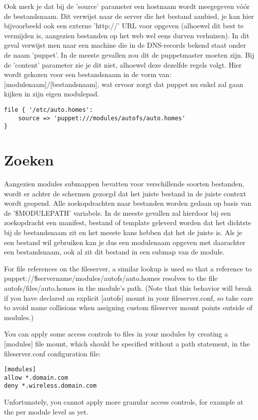 Ook merk je dat bij de 'source' parameter een hostnaam wordt meegegeven v\'o\'or de bestandsnaam. Dit verwijst naar de server die het bestand aanbied, je kan hier bijvoorbeeld ook een externe 'http://' URL voor opgeven (alhoewel dit best te vermijden is, aangezien bestanden op het web wel eens durven verhuizen). In dit geval verwijst men naar een machine die in de DNS-records bekend staat onder de naam 'puppet'. In de meeste gevallen zou dit de puppetmaster moeten zijn. Bij de 'content' parameter zie je dit niet, alhoewel deze dezelfde regels volgt. Hier wordt gekozen voor een bestandsnaam in de vorm van: [modulenaam]/[bestandsnaam], wat ervoor zorgt dat puppet nu enkel zal gaan kijken in zijn eigen modulepad.
%
\begin{code}
\begin{lstlisting}
file { '/etc/auto.homes':
    source => 'puppet:///modules/autofs/auto.homes'
}
\end{lstlisting}
\end{code}
%
\section{Zoeken}
Aangezien modules submappen bevatten voor verschillende soorten bestanden, wordt er achter de schermen gezorgd dat het juiste bestand in de juiste context wordt geopend. Alle zoekopdrachten naar bestanden worden gedaan op basis van de '\$MODULEPATH' variabele. In de meeste gevallen zal hierdoor bij een zoekopdracht een manifest, bestand of template geleverd worden dat het dichtste bij de bestandsnaam zit en het meeste kans hebben dat het de juiste is. Als je een bestand wil gebruiken kan je dus een modulenaam opgeven met daarachter een bestandsnaam, ook al zit dit bestand in een submap van de module.

For file references on the fileserver, a similar lookup is used so that a reference to puppet://\$servername/modules/autofs/auto.homes resolves to the file autofs/files/auto.homes in the module's path. (Note that this behavior will break if you have declared an explicit [autofs] mount in your fileserver.conf, so take care to avoid name collisions when assigning custom fileserver mount points outside of modules.)

You can apply some access controls to files in your modules by creating a [modules] file mount, which should be specified without a path statement, in the fileserver.conf configuration file:
%
\begin{code}
\begin{lstlisting}
[modules]
allow *.domain.com
deny *.wireless.domain.com
\end{lstlisting}
\end{code}
%
Unfortunately, you cannot apply more granular access controls, for example at the per module level as yet.

